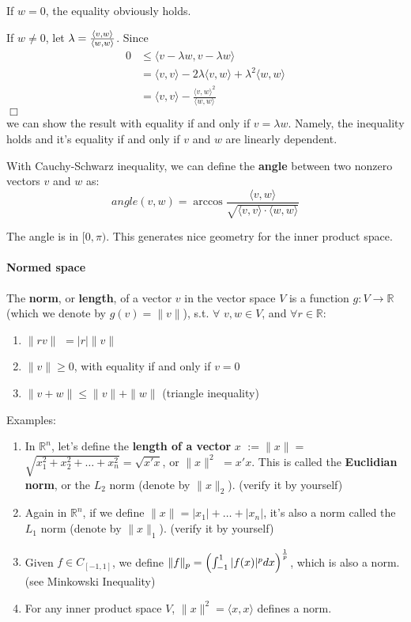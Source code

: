 \documentclass[12pt,oneside]{article}
\begin{document}
If $w=0$, the equality obviously holds.

If $w\neq0$, let $\lambda={\langle v,w \rangle \over \langle w,w \rangle}$. Since
\[
\begin{aligned}
0 &\leq \langle v - \lambda w, v - \lambda w \rangle \\
  &= \langle v,v \rangle - 2\lambda \langle v, w \rangle +\lambda^2 \langle w, w \rangle \\
  &= \langle v,v \rangle - \frac{\langle v,w \rangle^2 }{\langle w,w \rangle}
\end{aligned}
\] $\Box$\\

\noindent  we can show the result with equality if and only if $v=\lambda w$.
Namely, the inequality holds and it's equality if and only if $v$ and $w$ are linearly dependent.

With Cauchy-Schwarz inequality, we can define the \textbf{angle} between two nonzero vectors $v$ and $w$ as:
\[
angle(v,w)=\arccos{ \frac {\langle v,w \rangle } {\sqrt{ \langle v,v \rangle \cdot \langle w,w \rangle}} }
\]

The angle is in $[0,\pi)$. This generates nice geometry for the inner product space.

\paragraph{Normed space}
The \textbf{norm}, or \textbf{length}, of a vector $v$ in the vector space $V$ is
 a function $g: V \rightarrow \mathbb{R}$ (which we denote by $g(v)= \|v\|$),
s.t. $\forall$ $v, w\in V$, and $\forall r \in \mathbb{R}$:
\begin{enumerate}
\item $\|rv\|$ $= |r|\|v\|$ 
\item $\|v\| \geq 0$, with equality if and only if $v=0$
\item $\|v+ w\| \leq \|v\|+\|w\|$ (triangle inequality)
\end{enumerate}

\noindent Examples:
\begin{enumerate}
\item In ${\mathbb{R}}^n$, let's define the \textbf{length of a vector} $x$ $ := \|x\| = $ $\sqrt{x_{1}^2 + x_{2}^2 + \ldots + x_{n}^2} = \sqrt{x'x}$, or $\|x\|^2$ $= x'x$. This is called the \textbf{Euclidian norm}, or the $L_2$ norm (denote by $\|x\|_2$). (verify it by yourself)
\item Again in ${\mathbb{R}}^n$, if we define $\|x\|=|x_1|+\ldots+|x_n|$, it's also a norm called the $L_1$ norm (denote by $\|x\|_1$). (verify it by yourself)
\item Given $f\in C_{[-1, 1]}$, we define $\|f\|_p=\left(\int_{-1}^1 |f(x)|^p dx \right)^{1\over p}$, which is also a norm. (see Minkowski Inequality)
\item For any inner product space \( V\), \(\|x\|^2= \langle x,x \rangle \) defines a norm.
\end{enumerate}
\end{document}
